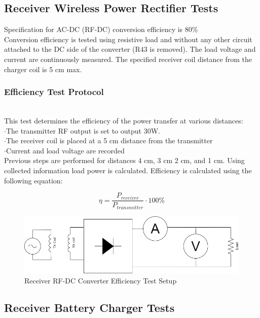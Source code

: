 \documentclass[12pt]{article}
\begin{document}
\subsection{Receiver Wireless Power Rectifier Tests}

\noindent
Specification  for AC-DC (RF-DC) conversion efficiency is 80\%\\
 
\noindent
Conversion efficiency is tested using resistive load and without any other circuit attached to the DC side of the converter (R43 is removed). The load voltage and current are continuously  measured.  The specified receiver coil distance from the charger coil is 5 cm max.
\subsubsection*{Efficiency Test Protocol}\hfill \\
\noindent
This test determines the efficiency of the power transfer at various distances:\\
\indent \indent $\cdot$The transmitter RF output is set to output 30W.\\
\indent \indent $\cdot$The receiver coil is placed at a 5 cm distance from the transmitter\\
\indent \indent $\cdot$Current and load voltage are recorded\\

\noindent
Previous steps are performed for distances 4 cm, 3 cm 2 cm, and 1 cm.  Using collected information load power is calculated.  Efficiency is calculated using the following equation:

\begin{equation}
\eta = \frac{P_{receiver}}{P_{transmitter}} \cdot 100\%
\end{equation}
\hfill
\begin{figure}[h!]
\centering
\includegraphics[width=0.8\linewidth]{RX_EFF_TEST}
\caption{Receiver RF-DC Converter Efficiency Test Setup}
\end{figure}

\subsection{Receiver Battery Charger Tests}
\end{document}
